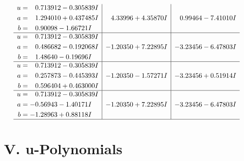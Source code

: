 \documentclass[1p]{elsarticle_modified}
\theoremstyle{definition}
\begin{document}
$$\begin{array}{c|c|c}
\begin{aligned}
u &= \phantom{-}0.713912 - 0.305839 I \\
a &= \phantom{-}1.294010 + 0.437485 I \\
b &= \phantom{-}0.90098 - 1.66721 I\end{aligned}
 & \phantom{-}4.33996 + 4.35870 I & \phantom{-}0.99464 - 7.41010 I \\ \hline\begin{aligned}
u &= \phantom{-}0.713912 - 0.305839 I \\
a &= \phantom{-}0.486682 - 0.192068 I \\
b &= \phantom{-}1.48640 - 0.19696 I\end{aligned}
 & -1.20350 + 7.22895 I & -3.23456 - 6.47803 I \\ \hline\begin{aligned}
u &= \phantom{-}0.713912 - 0.305839 I \\
a &= \phantom{-}0.257873 - 0.445393 I \\
b &= \phantom{-}0.596404 + 0.463000 I\end{aligned}
 & -1.20350 - 1.57271 I & -3.23456 + 0.51914 I \\ \hline\begin{aligned}
u &= \phantom{-}0.713912 - 0.305839 I \\
a &= -0.56943 - 1.40171 I \\
b &= -1.28963 + 0.88118 I\end{aligned}
 & -1.20350 + 7.22895 I & -3.23456 - 6.47803 I\\
 \hline 
 \end{array}$$\newpage
\newpage\renewcommand{\arraystretch}{1}
\centering \section*{ V. u-Polynomials}
\end{document}
